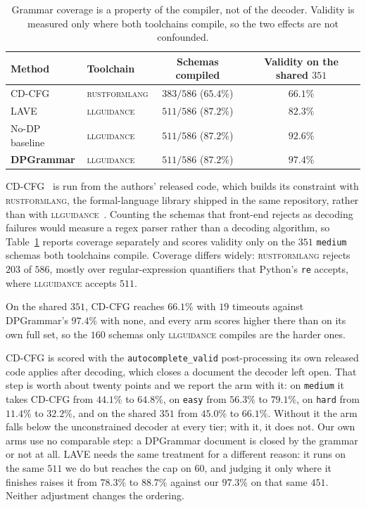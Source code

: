 \begin{table}[t]
\centering
\small
\caption{Grammar coverage is a property of the compiler, not of the decoder.
Validity is measured only where both toolchains compile, so the two effects are
not confounded.}
\label{tab:coverage}
\begin{tabular}{llcc}
\toprule
Method & Toolchain & Schemas compiled & Validity on the shared $351$ \\
\midrule
CD-CFG             & \textsc{rustformlang} & $383/586$ ($65.4\%$) & $66.1\%$ \\
LAVE               & \textsc{llguidance}   & $511/586$ ($87.2\%$) & $82.3\%$ \\
No-DP baseline     & \textsc{llguidance}   & $511/586$ ($87.2\%$) & $92.6\%$ \\
\textbf{DPGrammar} & \textsc{llguidance}   & $511/586$ ($87.2\%$) & $\mathbf{97.4\%}$ \\
\bottomrule
\end{tabular}
\end{table}

CD-CFG~\citep{cd4dllm} is run from the authors' released code, which builds its
constraint with \textsc{rustformlang}, the formal-language library shipped in the
same repository, rather than with
\textsc{llguidance}~\citep{microsoft2025llguidance}. Counting the schemas that
front-end rejects as decoding failures would measure a regex parser rather than a
decoding algorithm, so Table~\ref{tab:coverage} reports coverage separately and
scores validity only on the $351$ \texttt{medium} schemas both toolchains
compile. Coverage differs widely: \textsc{rustformlang} rejects $203$ of $586$,
mostly over regular-expression quantifiers that Python's \texttt{re} accepts,
where \textsc{llguidance} accepts $511$.

On the shared $351$, CD-CFG reaches $66.1\%$ with $19$ timeouts against
DPGrammar's $97.4\%$ with none, and every arm scores higher there than on its own
full set, so the $160$ schemas only \textsc{llguidance} compiles are the harder
ones.

CD-CFG is scored with the \texttt{autocomplete\_valid} post-processing its own
released code applies after decoding, which closes a document the decoder left
open. That step is worth about twenty points and we report the arm with it: on
\texttt{medium} it takes CD-CFG from $44.1\%$ to $64.8\%$, on \texttt{easy} from
$56.3\%$ to $79.1\%$, on \texttt{hard} from $11.4\%$ to $32.2\%$, and on the
shared $351$ from $45.0\%$ to $66.1\%$. Without it the arm falls below the
unconstrained decoder at every tier; with it, it does not. Our own arms use no
comparable step: a DPGrammar document is closed by the grammar or not at all. LAVE
needs the same treatment for a different reason: it runs on the same $511$ we do
but reaches the cap on $60$, and judging it only where it finishes raises it from
$78.3\%$ to $88.7\%$ against our $97.3\%$ on that same $451$. Neither adjustment
changes the ordering.

